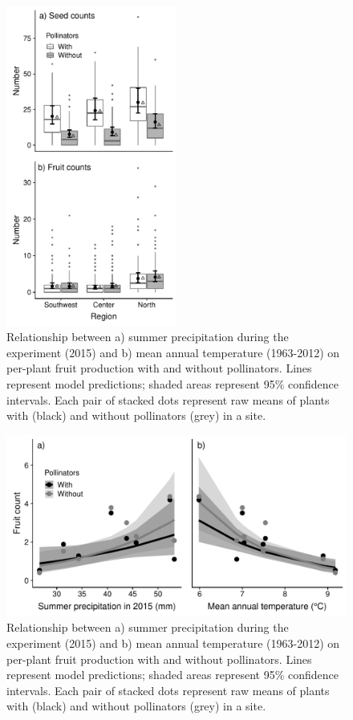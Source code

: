 \documentclass{article}
\begin{document}
\begin{figure}[p]
\centering
\includegraphics[width = 0.5\textwidth]{figs/seeds_fruits_region}
\caption{Relationship between a) summer precipitation during the experiment (2015) and b) mean annual temperature (1963-2012) on per-plant fruit production with and without pollinators. Lines represent model predictions; shaded areas represent 95\% confidence intervals. Each pair of stacked dots represent raw means of plants with (black) and without pollinators (grey) in a site.}
\label{seedsfruitsregion}
\end{figure}


\clearpage


\begin{figure}[p]
\centering
\includegraphics[width = \textwidth]{figs/fruit_climate}
\caption{Relationship between a) summer precipitation during the experiment (2015) and b) mean annual temperature (1963-2012) on per-plant fruit production with and without pollinators. Lines represent model predictions; shaded areas represent 95\% confidence intervals. Each pair of stacked dots represent raw means of plants with (black) and without pollinators (grey) in a site.}
\label{fruitsclimate}
\end{figure}
\end{document}
